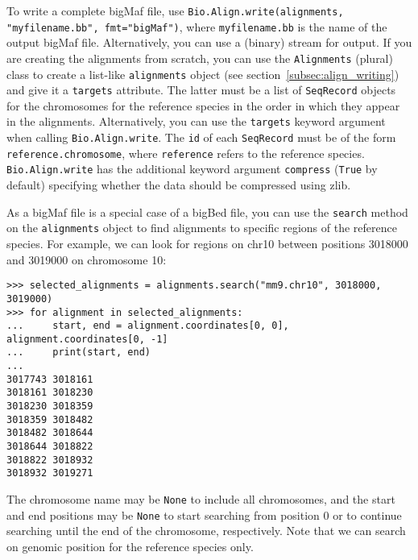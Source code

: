 To write a complete bigMaf file, use \verb|Bio.Align.write(alignments, "myfilename.bb", fmt="bigMaf")|, where \verb|myfilename.bb| is the name of the output bigMaf file. Alternatively, you can use a (binary) stream for output. If you are creating the alignments from scratch, you can use the \verb|Alignments| (plural) class to create a list-like \verb|alignments| object (see section~\ref{subsec:align_writing}) and give it a \verb|targets| attribute. The latter must be a list of \verb|SeqRecord| objects for the chromosomes for the reference species in the order in which they appear in the alignments. Alternatively, you can use the \verb|targets| keyword argument when calling \verb|Bio.Align.write|. The \verb|id| of each \verb|SeqRecord| must be of the form \verb|reference.chromosome|, where \verb|reference| refers to the reference species. \verb|Bio.Align.write| has the additional keyword argument \verb|compress| (\verb|True| by default) specifying whether the data should be compressed using zlib.

As a bigMaf file is a special case of a bigBed file, you can use the \verb|search| method on the \verb|alignments| object to find alignments to specific regions of the reference species. For example, we can look for regions on chr10 between positions 3018000 and 3019000 on chromosome 10:

\begin{verbatim}
>>> selected_alignments = alignments.search("mm9.chr10", 3018000, 3019000)
>>> for alignment in selected_alignments:
...     start, end = alignment.coordinates[0, 0], alignment.coordinates[0, -1]
...     print(start, end)
...
3017743 3018161
3018161 3018230
3018230 3018359
3018359 3018482
3018482 3018644
3018644 3018822
3018822 3018932
3018932 3019271
\end{verbatim}
The chromosome name may be \verb|None| to include all chromosomes, and the start and end positions may be \verb|None| to start searching from position 0 or to continue searching until the end of the chromosome, respectively. Note that we can search on genomic position for the reference species only.
